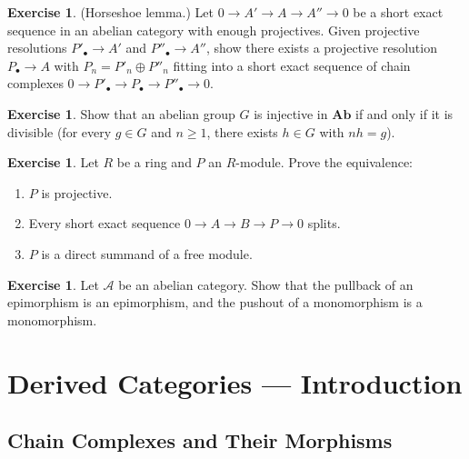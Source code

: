 \documentclass[a4paper,12pt]{book}
\newcommand{\Ab}{\mathbf{Ab}}
\theoremstyle{definition}
\newtheorem{exercise}[definition]{Exercise}
\theoremstyle{plain}
\theoremstyle{remark}
\begin{document}
\begin{exercise}\label{exo:horseshoe}
(Horseshoe lemma.) Let $0 \to A' \to A \to A'' \to 0$ be a short exact sequence in an
abelian category with enough projectives. Given projective resolutions
$P'_\bullet \to A'$ and $P''_\bullet \to A''$, show there exists a projective resolution
$P_\bullet \to A$ with $P_n = P'_n \oplus P''_n$ fitting into a short exact sequence
of chain complexes $0 \to P'_\bullet \to P_\bullet \to P''_\bullet \to 0$.
\end{exercise}

\begin{exercise}\label{exo:injective-divisible}
Show that an abelian group $G$ is injective in $\Ab$ if and only if it is divisible
(for every $g \in G$ and $n \geq 1$, there exists $h \in G$ with $nh = g$).
\end{exercise}

\begin{exercise}\label{exo:projective-characterization}
Let $R$ be a ring and $P$ an $R$-module. Prove the equivalence:
\begin{enumerate}
    \item $P$ is projective.
    \item Every short exact sequence $0 \to A \to B \to P \to 0$ splits.
    \item $P$ is a direct summand of a free module.
\end{enumerate}
\end{exercise}

\begin{exercise}\label{exo:abelian-pullback}
Let $\mathcal{A}$ be an abelian category. Show that the pullback of an epimorphism is
an epimorphism, and the pushout of a monomorphism is a monomorphism.
\end{exercise}


\chapter{Derived Categories --- Introduction}\label{ch:derived}
\minitoc

\section{Chain Complexes and Their Morphisms}\label{sec:chain-complexes}
\end{document}
